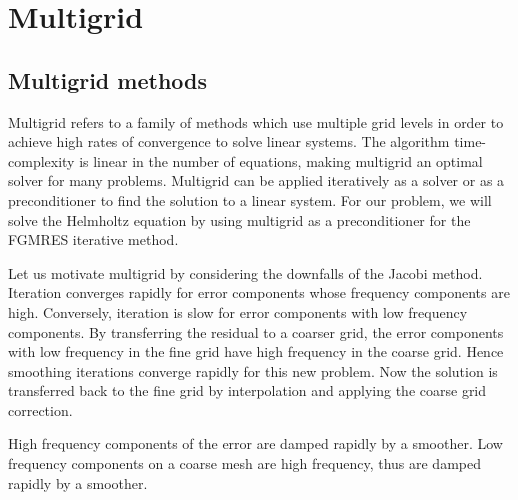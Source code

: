 \chapter{Multigrid}
\label{sec:mg}


\section{Multigrid methods}

Multigrid refers to a family of methods which use multiple grid levels in order to achieve high rates of convergence to solve linear systems.
The algorithm time-complexity is linear in the number of equations, making multigrid an optimal solver for many problems.
Multigrid can be applied iteratively as a solver or as a preconditioner to find the solution to a linear system.
For our problem, we will solve the Helmholtz equation by using multigrid as a preconditioner for the FGMRES iterative method.

Let us motivate multigrid by considering the downfalls of the Jacobi method.
Iteration converges rapidly for error components whose frequency components are high.
Conversely, iteration is slow for error components with low frequency components.
By transferring the residual to a coarser grid, the error components with low frequency in the fine grid have high frequency in the coarse grid.
Hence smoothing iterations converge rapidly for this new problem.
Now the solution is transferred back to the fine grid by interpolation and applying the coarse grid correction.

High frequency components of the error are damped rapidly by a smoother.
Low frequency components on a coarse mesh are high frequency, thus are damped rapidly by a smoother.


